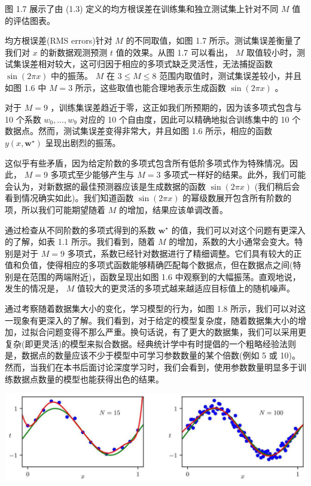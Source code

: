\documentclass[10pt]{article}
\begin{document}
图 1.7 展示了由 (1.3) 定义的均方根误差在训练集和独立测试集上针对不同 \(M\) 值的评估图表。

均方根误差(RMS errors)针对 \(M\) 的不同取值，如图 1.7 所示。测试集误差衡量了我们对 \(x\) 的新数据观测预测 \(t\) 值的效果。从图 1.7 可以看出， \(M\) 取值较小时，测试集误差相对较大，这可归因于相应的多项式缺乏灵活性，无法捕捉函数 \(\sin \left( {2\pi x}\right)\) 中的振荡。 \(M\) 在 \(3 \leq  M \leq  8\) 范围内取值时，测试集误差较小，并且如图 1.6 中 \(M = 3\) 所示，这些取值也能合理地表示生成函数 \(\sin \left( {2\pi x}\right)\) 。

对于 \(M = 9\) ，训练集误差趋近于零，这正如我们所预期的，因为该多项式包含与 10 个系数 \({w}_{0},\ldots ,{w}_{9}\) 对应的 10 个自由度，因此可以精确地拟合训练集中的 10 个数据点。然而，测试集误差变得非常大，并且如图 1.6 所示，相应的函数 \(y\left( {x,{\mathbf{w}}^{ \star  }}\right)\) 呈现出剧烈的振荡。

这似乎有些矛盾，因为给定阶数的多项式包含所有低阶多项式作为特殊情况。因此， \(M = 9\) 多项式至少能够产生与 \(M = 3\) 多项式一样好的结果。此外，我们可能会认为，对新数据的最佳预测器应该是生成数据的函数 \(\sin \left( {2\pi x}\right)\) (我们稍后会看到情况确实如此)。我们知道函数 \(\sin \left( {2\pi x}\right)\) 的幂级数展开包含所有阶数的项，所以我们可能期望随着 \(M\) 的增加，结果应该单调改善。

通过检查从不同阶数的多项式得到的系数 \({\mathbf{w}}^{ \star  }\) 的值，我们可以对这个问题有更深入的了解，如表 1.1 所示。我们看到，随着 \(M\) 的增加，系数的大小通常会变大。特别是对于 \(M = 9\) 多项式，系数已经针对数据进行了精细调整。它们具有较大的正值和负值，使得相应的多项式函数能够精确匹配每个数据点，但在数据点之间(特别是在范围的两端附近)，函数呈现出如图 1.6 中观察到的大幅振荡。直观地说，发生的情况是， \(M\) 值较大的更灵活的多项式越来越适应目标值上的随机噪声。

通过考察随着数据集大小的变化，学习模型的行为，如图 1.8 所示，我们可以对这一现象有更深入的了解。我们看到，对于给定的模型复杂度，随着数据集大小的增加，过拟合问题变得不那么严重。换句话说，有了更大的数据集，我们可以采用更复杂(即更灵活)的模型来拟合数据。经典统计学中有时提倡的一个粗略经验法则是，数据点的数量应该不少于模型中可学习参数数量的某个倍数(例如 5 或 10)。然而，当我们在本书后面讨论深度学习时，我们会看到，使用参数数量明显多于训练数据点数量的模型也能获得出色的结果。

\begin{center}
\includegraphics[max width=1.0\textwidth]{images/0194e279-9b28-703a-88f4-c3ac21e2010d_31_240_344_1311_382_0.jpg}
\end{center}
\hspace*{3em} 
\end{document}
